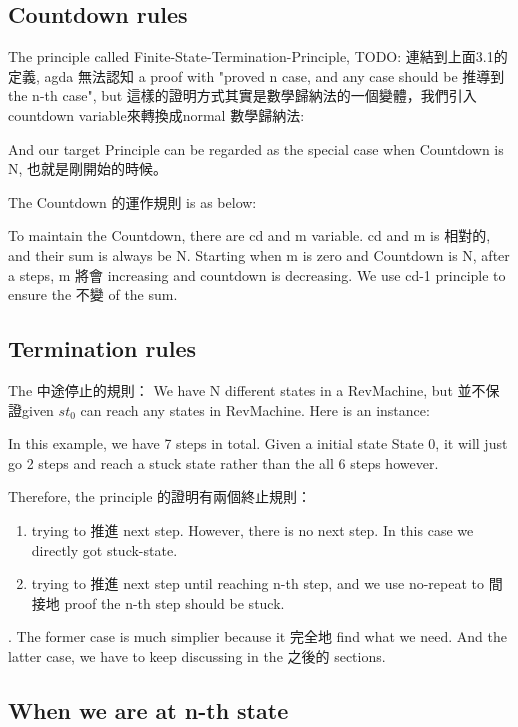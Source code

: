 \subsection{ Countdown rules }
The principle called Finite-State-Termination-Principle, {TODO: 連結到上面3.1的定義}, agda 無法認知 a proof with "proved n case, and any case should be 推導到 the n-th case", but 這樣的證明方式其實是數學歸納法的一個變體，我們引入countdown variable來轉換成normal 數學歸納法:


And our target Principle can be regarded as the special case when Countdown is N, 也就是剛開始的時候。

The Countdown 的運作規則 is as below:


To maintain the Countdown, there are cd and m variable.  cd and m is 相對的, and their sum is always be N.  Starting when m is zero and Countdown is N, after a steps, m 將會 increasing and countdown is decreasing.  We use cd-1 principle to ensure the 不變 of the sum.

\subsection{ Termination rules }
The 中途停止的規則：
We have N different states in a RevMachine, but 並不保證given $st_{0}$ can reach any states in RevMachine.  Here is an instance: 



In this example, we have 7 steps in total.  Given a initial state State 0, it will just go 2 steps and reach a stuck state rather than the all 6 steps however.

Therefore, the principle 的證明有兩個終止規則：
\begin{enumerate}[1.]
    \item trying to 推進 next step.  However, there is no next step.  In this case we directly got stuck-state. 
    \item trying to 推進 next step until reaching n-th step, and we use no-repeat to 間接地 proof the n-th step should be stuck.
\end{enumerate}.
The former case is much simplier because it 完全地 find what we need. 
And the latter case, we have to keep discussing in the 之後的 sections.

\subsection{ When we are at n-th state }

